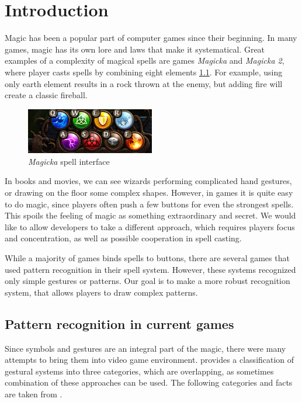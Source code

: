 
\chapter{Introduction}
\label{chap:gf}

Magic has been a popular part of computer games since their beginning. In many games, magic has its own lore and laws that make it systematical. Great examples of a complexity of magical spells are games \emph{Magicka} and \emph{Magicka 2}, where player casts spells by combining eight elements \ref{fig:magicka}. For example, using only earth element results in a rock thrown at the enemy, but adding fire will create a classic fireball.
\begin{figure}[!htb]
  \centering
  \includegraphics[width=0.5\textwidth]{ext/magicka.png}
  \caption{\emph{Magicka} spell interface}
  \label{fig:magicka}
\end{figure}

In books and movies, we can see wizards performing complicated hand gestures, or drawing on the floor some complex shapes. However, in games it is quite easy to do magic, since players often push a few buttons for even the strongest spells. This spoils the feeling of magic as something extraordinary and secret. We would like to allow developers to take a different approach, which requires players focus and concentration, as well as possible cooperation in spell casting.

While a majority of games binds spells to buttons, there are several games that used pattern recognition in their spell system. However, these systems recognized only simple gestures or patterns. Our goal is to make a more robust recognition system, that allows players to draw complex patterns.

\section{Pattern recognition in current games}

Since symbols and gestures are an integral part of the magic, there were many attempts to bring them into video game environment. \citet{gameMagic} provides a classification of gestural systems into three categories, which are overlapping, as sometimes combination of these approaches can be used. The following categories and facts are taken from \citet{gameMagic}.

